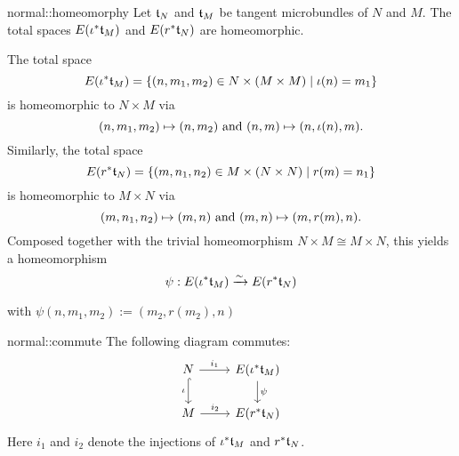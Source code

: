 \begin{mylemma}{normal::homeomorphy}
    Let $\mathfrak{t}_N$ and $\mathfrak{t}_M$ be tangent microbundles of $N$ and $M$.
    The total spaces $E(\iota^*\mathfrak{t}_M)$ and $E(r^*\mathfrak{t}_N)$ are homeomorphic.
\end{mylemma}

\begin{myproof}
    The total space
    \[ E(\iota^*\mathfrak{t}_M) = \{ (n, m_1, m_2) \in N \times (M \times M) \mid \iota(n) = m_1\} \]
    is homeomorphic to $N \times M$ via
    \[ (n, m_1, m_2) \mapsto (n, m_2) \text{ and } (n, m) \mapsto (n, \iota(n), m). \]
    Similarly, the total space
    \[ E(r^*\mathfrak{t}_N) = \{ (m, n_1, n_2) \in M \times (N \times N) \mid r(m) = n_1\} \]
    is homeomorphic to $M \times N$ via
    \[ (m, n_1, n_2) \mapsto (m, n) \text{ and } (m, n) \mapsto (m, r(m), n). \]
    Composed together with the trivial homeomorphism $N \times M \cong M \times N$, this yields a homeomorphism
    \[ \psi: E(\iota^*\mathfrak{t}_M) \xrightarrow{\sim} E(r^*\mathfrak{t}_N) \]
    \begin{center}
        with $\psi(n, m_1, m_2) := (m_2, r(m_2), n)$
    \end{center}
\end{myproof}

\begin{myremark}{normal::commute}
    The following diagram commutes:
    \[
        \begin{tikzcd}
            N \ar[r, "i_1"] \ar[hookrightarrow, "\iota"']{d} & E(\ind{\iota}\bt_M) \ar[d, "\psi"] \\
            M \ar[r, "i_2"] & E(\ind{r}\bt_N)
        \end{tikzcd}
    \]
    Here $i_1$ and $i_2$ denote the injections of $\iota^*\mathfrak{t}_M$ and $r^*\mathfrak{t}_N$.
\end{myremark}

